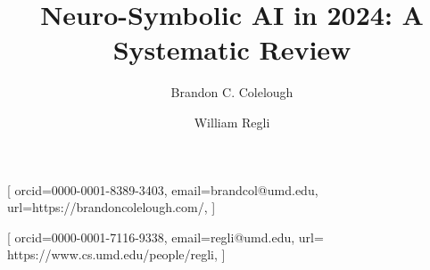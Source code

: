 \documentclass[hf]{ceurart}
\begin{document}

\conference{}
\title{Neuro-Symbolic AI in 2024: A Systematic Review}


\author[1]{Brandon C. Colelough}[%
orcid=0000-0001-8389-3403,
email=brandcol@umd.edu,
url=https://brandoncolelough.com/,
]
\cormark[1]
\address[1]{University of Maryland, College Park,
  8125 Paint Branch Dr, College Park, MD 20742}



\author[2]{William Regli}[%
orcid=0000-0001-7116-9338,
email=regli@umd.edu,
url= https://www.cs.umd.edu/people/regli,
]

\end{document}
